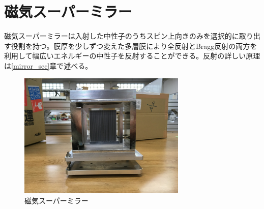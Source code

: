 \section{磁気スーパーミラー}
磁気スーパーミラーは入射した中性子のうちスピン上向きのみを選択的に取り出す役割を持つ。膜厚を少しずつ変えた多層膜により全反射とBragg反射の両方を利用して幅広いエネルギーの中性子を反射することができる。反射の詳しい原理は\ref{mirror_sec}章で述べる。

\begin{figure}[H]
\centering
\includegraphics[width=8cm]{device/mirrorphoto.jpg}\caption{磁気スーパーミラー}
\end{figure}